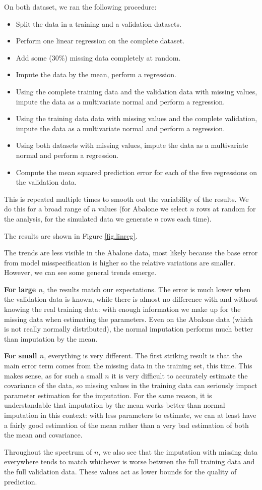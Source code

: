 On both dataset, we ran the following procedure:
\begin{itemize}
\item Split the data in a training and a validation datasets.
\item Perform one linear regression on the complete dataset.
\item Add some (30\%) missing data completely at random.
\item Impute the data by the mean, perform a regression.
\item Using the complete training data and the validation data with missing values, impute the data as a multivariate normal and perform a regression.
\item Using the training data data with missing values and the complete validation, impute the data as a multivariate normal and perform a regression.
\item Using both datasets with missing values, impute the data as a multivariate normal and perform a regression.
\item Compute the mean squared prediction error for each of the five regressions on the validation data.
\end{itemize}
		
This is repeated multiple times to smooth out the variability of the results. We do this for a broad range of $n$ values (for Abalone we select $n$ rows at random for the analysis, for the simulated data we generate $n$ rows each time).

The results are shown in Figure \ref{fig.linreg}. 



The trends are less visible in the Abalone data, most likely because the base error from model misspecification is higher so the relative variations are smaller. However, we can see some general trends emerge.

\textbf{For large $n$}, the results match our expectations. The error is much lower when the validation data is known, while there is almost no difference with and without knowing the real training data: with enough information we make up for the missing data when estimating the parameters. Even on the Abalone data (which is not really normally distributed), the normal imputation performs much better than imputation by the mean.

\textbf{For small $n$}, everything is very different. The first striking result is that the main error term comes from the missing data in the training set, this time. This makes sense, as for such a small $n$ it is very difficult to accurately estimate the covariance of the data, so missing values in the training data can seriously impact parameter estimation for the imputation. For the same reason, it is understandable that imputation by the mean works better than normal imputation in this context: with less parameters to estimate, we can at least have a fairly good estimation of the mean rather than a very bad estimation of both the mean and covariance. 

Throughout the spectrum of $n$, we also see that the imputation with missing data everywhere tends to match whichever is worse between the full training data and the full validation data. These values act as lower bounds for the quality of prediction.